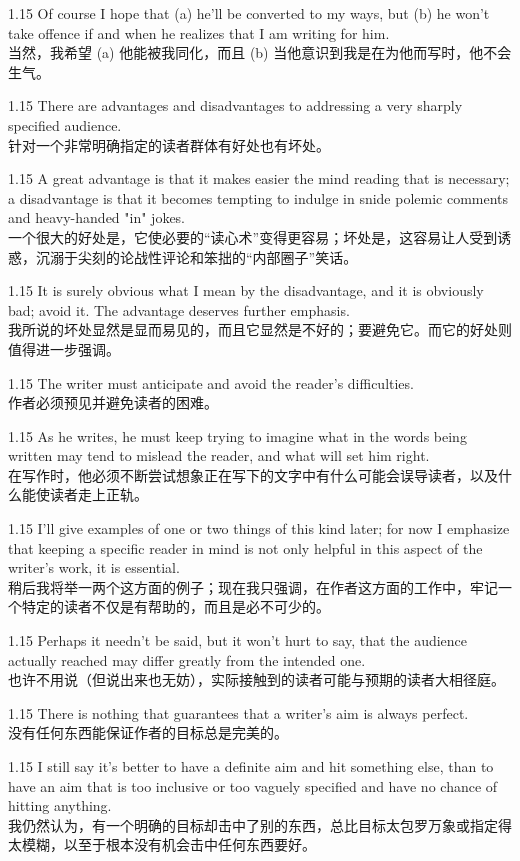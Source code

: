\documentclass[12pt,a4paper]{article}
\newcommand{\bilingual}[2]{
    \begin{spacing}{1.15} %
        \noindent \normalsize #1 \\[-0.5ex] %
        \small \textcolor{blue!70!black}{#2} %
    \end{spacing}
    \vspace{0.8em} %
}
\begin{document}
\bilingual{Of course I hope that (a) he'll be converted to my ways, but (b) he won't take offence if and when he realizes that I am writing for him.}
{当然，我希望 (a) 他能被我同化，而且 (b) 当他意识到我是在为他而写时，他不会生气。} %

\bilingual{There are advantages and disadvantages to addressing a very sharply specified audience.}
{针对一个非常明确指定的读者群体有好处也有坏处。} %

\bilingual{A great advantage is that it makes easier the mind reading that is necessary; a disadvantage is that it becomes tempting to indulge in snide polemic comments and heavy-handed "in" jokes.}
{一个很大的好处是，它使必要的“读心术”变得更容易；坏处是，这容易让人受到诱惑，沉溺于尖刻的论战性评论和笨拙的“内部圈子”笑话。} %

\bilingual{It is surely obvious what I mean by the disadvantage, and it is obviously bad; avoid it. The advantage deserves further emphasis.}
{我所说的坏处显然是显而易见的，而且它显然是不好的；要避免它。而它的好处则值得进一步强调。} %

\bilingual{The writer must anticipate and avoid the reader's difficulties.}
{作者必须预见并避免读者的困难。} %

\bilingual{As he writes, he must keep trying to imagine what in the words being written may tend to mislead the reader, and what will set him right.}
{在写作时，他必须不断尝试想象正在写下的文字中有什么可能会误导读者，以及什么能使读者走上正轨。} %

\bilingual{I'll give examples of one or two things of this kind later; for now I emphasize that keeping a specific reader in mind is not only helpful in this aspect of the writer's work, it is essential.}
{稍后我将举一两个这方面的例子；现在我只强调，在作者这方面的工作中，牢记一个特定的读者不仅是有帮助的，而且是必不可少的。} %

\bilingual{Perhaps it needn't be said, but it won't hurt to say, that the audience actually reached may differ greatly from the intended one.}
{也许不用说（但说出来也无妨），实际接触到的读者可能与预期的读者大相径庭。} %

\bilingual{There is nothing that guarantees that a writer's aim is always perfect.}
{没有任何东西能保证作者的目标总是完美的。} %

\bilingual{I still say it's better to have a definite aim and hit something else, than to have an aim that is too inclusive or too vaguely specified and have no chance of hitting anything.}
{我仍然认为，有一个明确的目标却击中了别的东西，总比目标太包罗万象或指定得太模糊，以至于根本没有机会击中任何东西要好。} %
\end{document}
